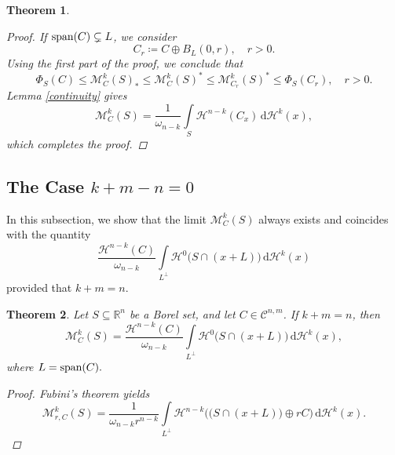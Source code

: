 \documentclass[pdflatex,sn-mathphys-num]{sn-jnl}
\theoremstyle{plain}
\newtheorem{theorem}{Theorem}[section]
\theoremstyle{definition}
\DeclareMathOperator{\LO}{\textup{span}}
\newcommand{\dH}[1]{\,\mathrm d\mathcal{H}^{#1}}
\begin{document}
\begin{theorem}
\begin{proof}
        If $\LO(C)\subsetneq L$, we consider $$C_{r}\coloneq C\oplus B_{L}(0, r),\quad r>0.$$ Using the first part of the proof, we conclude that $$\Phi_S(C)\leq\mathcal{M}^k_C(S)_*\leq\mathcal{M}^k_C(S)^*\leq\mathcal{M}^k_{C_{r}}(S)^*\leq\Phi_S(C_{r}),\quad r>0.$$ 
        Lemma \ref{continuity} gives $$\mathcal{M}^k_C(S)=\frac{1}{\omega_{n-k}}\int\limits_{S}\mathcal{H}^{n-k}(C_x)\dH{k}(x),$$ which completes the proof.
        \end{proof}\end{theorem}
\subsection{The Case $k+m-n=0$}
In this subsection, we show that the limit $\mathcal{M}^k_C(S)$ always exists and coincides with the quantity $$\frac{\mathcal{H}^{n-k}(C)}{\omega_{n-k}}\int\limits_{L^{\perp}}\mathcal{H}^{0}\big(S\cap(x+L)\big)\dH{k}(x)$$ provided that $k+m=n$. \begin{theorem}\label{k+m=n}
    Let $S\subseteq\mathbb{R}^n$ be a Borel set, and let $C\in\mathcal{C}^{n, m}$. If $k+m=n$, then $$\mathcal{M}^k_C(S)=\frac{\mathcal{H}^{n-k}(C)}{\omega_{n-k}}\int\limits_{L^{\perp}}\mathcal{H}^{0}\big(S\cap(x+L)\big)\dH{k}(x),$$ where $L=\LO(C).$
    \begin{proof}
        Fubini's theorem yields $$\mathcal{M}^k_{r, C}(S)=\frac{1}{\omega_{n-k}r^{n-k}}\int\limits_{L^{\perp}}\mathcal{H}^{n-k}\Big(\big(S\cap (x+L)\big)\oplus rC\Big)\dH{k}(x).$$


\end{proof}
\end{theorem}
\end{document}
